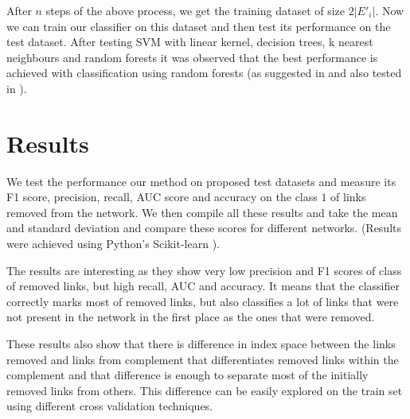 \documentclass{llncs}
\begin{document}
After $n$ steps of the above process, we get the training dataset of size $2 |E'_i|$. Now we can train our classifier on this dataset and then test its performance on the test dataset. After testing SVM with linear kernel, decision trees, k nearest neighbours and random forests it was observed that the best performance is achieved with classification using random forests (as suggested in \cite{features-for-sl} and also tested in \cite{ipynb-sl}).
%
\section{Results}
%
We test the performance our method on proposed test datasets and measure its F1 score, precision, recall, AUC score and accuracy on the class $1$ of links removed from the network. We then compile all these results and take the mean and standard deviation and compare these scores for different networks. (Results were achieved using Python's Scikit-learn \cite{scikit}).

The results are interesting as they show very low precision and F1 scores of class of removed links, but high recall, AUC and accuracy. It means that the classifier correctly marks most of removed links, but also classifies a lot of links that were not present in the network in the first place as the ones that were removed.

These results also show that there is difference in index space between the links removed and links from complement that differentiates removed links within the complement and that difference is enough to separate most of the initially removed links from others. This difference can be easily explored on the train set using different cross validation techniques.
\end{document}
